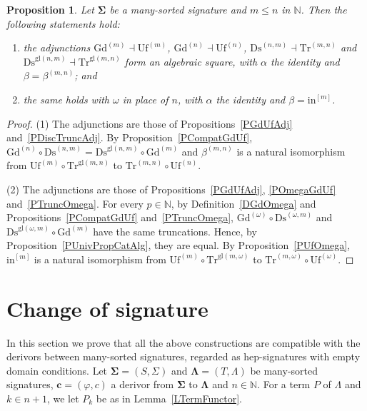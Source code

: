 \documentclass[a4paper,reqno]{amsart}
\newcommand{\sig}[1]{\mathbf{#1}}                %
\newcommand{\gl}{\mathrm{gl}}
\newcommand{\Gd}{\mathrm{Gd}}
\newcommand{\Uf}{\mathrm{Uf}}
\newcommand{\Ds}{\mathrm{Ds}}
\newcommand{\Tr}{\mathrm{Tr}}
\theoremstyle{plain}
\newtheorem{proposition}[theorem]{Proposition}
\theoremstyle{definition}
\begin{document}
\begin{proposition}\label{PAlgSquare}
Let $\sig{\Sigma}$ be a many-sorted signature and $m\leq n$ in $\mathbb{N}$.
Then the following statements hold:
\begin{enumerate}
\item the adjunctions $\Gd^{(m)}\dashv\Uf^{(m)}$, $\Gd^{(n)}\dashv\Uf^{(n)}$, $\Ds^{(n,m)}\dashv\Tr^{(m,n)}$ and $\Ds^{\gl(n,m)}\dashv\Tr^{\gl(m,n)}$ form an algebraic square, with $\alpha$ the identity and $\beta=\beta^{(m,n)}$; and
\item the same holds with $\omega$ in place of $n$, with $\alpha$ the identity and $\beta=\mathrm{in}^{[m]}$.
\end{enumerate}
\end{proposition}
\begin{proof}
(1) The adjunctions are those of Propositions~\ref{PGdUfAdj} and~\ref{PDiscTruncAdj}.
By Proposition~\ref{PCompatGdUf}, $\Gd^{(n)}\circ\Ds^{(n,m)}=\Ds^{\gl(n,m)}\circ\Gd^{(m)}$ and $\beta^{(m,n)}$ is a natural isomorphism from $\Uf^{(m)}\circ\Tr^{\gl(m,n)}$ to $\Tr^{(m,n)}\circ\Uf^{(n)}$.

(2) The adjunctions are those of Propositions~\ref{PGdUfAdj}, \ref{POmegaGdUf} and~\ref{PTruncOmega}.
For every $p\in\mathbb{N}$, by Definition~\ref{DGdOmega} and Propositions~\ref{PCompatGdUf} and~\ref{PTruncOmega}, $\Gd^{(\omega)}\circ\Ds^{(\omega,m)}$ and $\Ds^{\gl(\omega,m)}\circ\Gd^{(m)}$ have the same truncations.
Hence, by Proposition~\ref{PUnivPropCatAlg}, they are equal.
By Proposition~\ref{PUfOmega}, $\mathrm{in}^{[m]}$ is a natural isomorphism from $\Uf^{(m)}\circ\Tr^{\gl(m,\omega)}$ to $\Tr^{(m,\omega)}\circ\Uf^{(\omega)}$.
\end{proof}

\section{Change of signature}\label{SChangeSig}

In this section we prove that all the above constructions are compatible with the derivors between many-sorted signatures, regarded as hep-signatures with empty domain conditions.
Let $\sig{\Sigma}=(S,\Sigma)$ and $\sig{\Lambda}=(T,\Lambda)$ be many-sorted signatures, $\mathbf{c}=(\varphi,c)$ a derivor from $\sig{\Sigma}$ to $\sig{\Lambda}$ and $n\in\mathbb{N}$.
For a term $P$ of $\Lambda$ and $k\in n+1$, we let $P_{k}$ be as in Lemma~\ref{LTermFunctor}.
\end{document}
